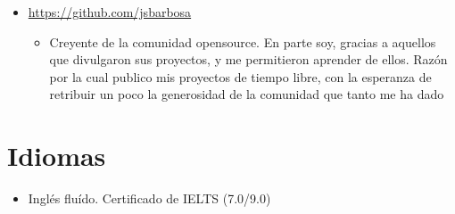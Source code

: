 \documentclass[11pt, letterpaper, sans]{moderncv}        %
\begin{document}
\begin{itemize}
		\item{
			{
				\url{https://github.com/jsbarbosa}
				\vspace{3pt}
				\begin{itemize}
					\item Creyente de la comunidad opensource. En parte soy, gracias a aquellos que divulgaron sus proyectos, y me permitieron aprender de ellos. Razón por la cual publico mis proyectos de tiempo libre, con la esperanza de retribuir un poco la generosidad de la comunidad que tanto me ha dado
				\end{itemize}
			}
		}
	\end{itemize}

\section{Idiomas}
\vspace{6pt}

\begin{itemize}
	\item Inglés flu\'ido. Certificado de IELTS (7.0/9.0)
\end{itemize}

\vfill
\enlargethispage{\footskip}
\let\thefootnote\relax{}
\end{document}

